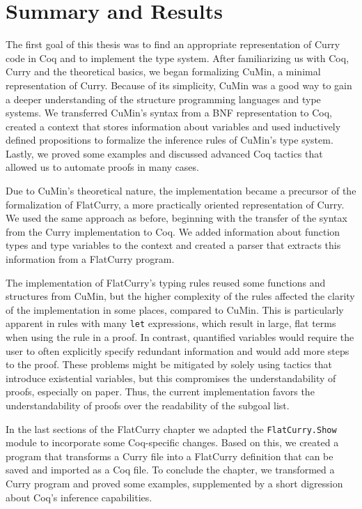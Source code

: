 \documentclass[paper = a4, fleqn, abstract=on, twoside]{scrreprt}
\begin{document}
\section{Summary and Results}
The first goal of this thesis was to find an appropriate representation of Curry code in Coq and to implement the type system. After familiarizing us with Coq, Curry and the theoretical basics, we began formalizing CuMin, a minimal representation of Curry. Because of its simplicity, CuMin was a good way to gain a deeper understanding of the structure programming languages and type systems. We transferred CuMin's syntax from a BNF representation to Coq, created a context that stores information about variables and used inductively defined propositions to formalize the inference rules of CuMin's type system. Lastly, we proved some examples and discussed advanced Coq tactics that allowed us to automate proofs in many cases.\\
\par \noindent
Due to CuMin's theoretical nature, the implementation became a precursor of the formalization of FlatCurry, a more practically oriented representation of Curry. We used the same approach as before, beginning with the transfer of the syntax from the Curry implementation to Coq. We added information about function types and type variables to the context and created a parser that extracts this information from a FlatCurry program.
\par
The implementation of FlatCurry's typing rules reused some functions and structures from CuMin, but the higher complexity of the rules affected the clarity of the implementation in some places, compared to CuMin. This is particularly apparent in rules with many \texttt{let} expressions, which result in large, flat terms when using the rule in a proof. In contrast, quantified variables would require the user to often explicitly specify redundant information and would add more steps to the proof. These problems might be mitigated by solely using tactics that introduce existential variables, but this compromises the understandability of proofs, especially on paper. Thus, the current implementation favors the understandability of proofs over the readability of the subgoal list.
\par
In the last sections of the FlatCurry chapter we adapted the \texttt{FlatCurry.Show} module to incorporate some Coq-specific changes. Based on this, we created a program that transforms a Curry file into a FlatCurry definition that can be saved and imported as a Coq file. To conclude the chapter, we transformed a Curry program and proved some examples, supplemented by a short digression about Coq's inference capabilities.\\
\end{document}
